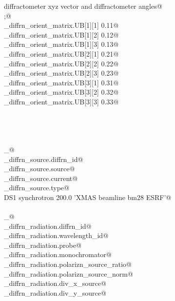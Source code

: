 \documentclass[10pt,a4paper,twoside,notitlepage]{article}
\begin{document}
\begin{flushleft}
\begin{minipage}{\linewidth}
\begin{list}{}{}
\mbox{}\verb@  diffractometer xyz vector and diffractometer angles@\\
\mbox{}\verb@;@\\
\mbox{}\verb@_diffrn_orient_matrix.UB[1][1]            0.11@\\
\mbox{}\verb@_diffrn_orient_matrix.UB[1][2]            0.12@\\
\mbox{}\verb@_diffrn_orient_matrix.UB[1][3]            0.13@\\
\mbox{}\verb@_diffrn_orient_matrix.UB[2][1]            0.21@\\
\mbox{}\verb@_diffrn_orient_matrix.UB[2][2]            0.22@\\
\mbox{}\verb@_diffrn_orient_matrix.UB[2][3]            0.23@\\
\mbox{}\verb@_diffrn_orient_matrix.UB[3][1]            0.31@\\
\mbox{}\verb@_diffrn_orient_matrix.UB[3][2]            0.32@\\
\mbox{}\verb@_diffrn_orient_matrix.UB[3][3]            0.33@\\
\mbox{}\verb@@\\
\mbox{}\verb@@\\
\mbox{}\verb@@\\
\mbox{}\verb@@\\
\mbox{}\verb@loop_@\\
\mbox{}\verb@_diffrn_source.diffrn_id@\\
\mbox{}\verb@_diffrn_source.source@\\
\mbox{}\verb@_diffrn_source.current@\\
\mbox{}\verb@_diffrn_source.type@\\
\mbox{}\verb@ DS1 synchrotron 200.0 'XMAS beamline bm28 ESRF'@\\
\mbox{}\verb@@\\
\mbox{}\verb@loop_@\\
\mbox{}\verb@_diffrn_radiation.diffrn_id@\\
\mbox{}\verb@_diffrn_radiation.wavelength_id@\\
\mbox{}\verb@_diffrn_radiation.probe@\\
\mbox{}\verb@_diffrn_radiation.monochromator@\\
\mbox{}\verb@_diffrn_radiation.polarizn_source_ratio@\\
\mbox{}\verb@_diffrn_radiation.polarizn_source_norm@\\
\mbox{}\verb@_diffrn_radiation.div_x_source@\\
\mbox{}\verb@_diffrn_radiation.div_y_source@\\

\end{list}
\end{minipage}
\end{flushleft}
\end{document}
